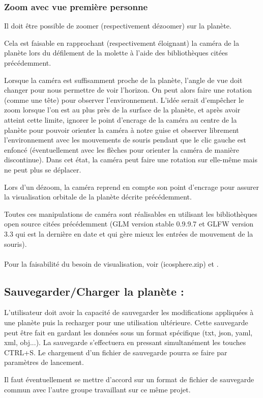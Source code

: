 \documentclass[a4paper]{article}
\begin{document}
        \subsubsection{Zoom avec vue première personne} 
        Il doit être possible de zoomer (respectivement dézoomer) sur la planète. 
        
        Cela est faisable en rapprochant (respectivement éloignant) la caméra de la planète lors du défilement de la molette à l'aide des bibliothèques citées précédemment.
        
        Lorsque la caméra est suffisamment proche de la planète, l'angle de vue doit changer pour nous permettre de voir l'horizon. On peut alors faire une rotation (comme une tête) pour observer l'environnement. L'idée serait d'empêcher le zoom lorsque l'on est au plus près de la surface de la planète, et après avoir atteint cette limite, ignorer le point d'encrage de la caméra au centre de la planète pour pouvoir orienter la caméra à notre guise et observer librement l'environnement avec les mouvements de souris pendant que le clic gauche est enfoncé (éventuellement avec les flèches pour orienter la caméra de manière discontinue). Dans cet état, la caméra peut faire une rotation sur elle-même mais ne peut plus se déplacer. 
        
        Lors d'un dézoom, la caméra reprend en compte son point d'encrage pour assurer la visualisation orbitale de la planète décrite précédemment.
        
        Toutes ces manipulations de caméra sont réalisables en utilisant les bibliothèques open source citées précédemment (GLM version stable  0.9.9.7 et GLFW version 3.3 qui est la dernière en date et qui gère mieux les entrées de mouvement de la souris).
        \\\\
        Pour la faisabilité du besoin de visualisation, voir \cite{SongHoAhn} (icosphere.zip) et \cite{TutoCamera}.\\

\subsection{Sauvegarder/Charger la planète :}

    \indent L'utilisateur doit avoir la capacité de sauvegarder les modifications appliquées à une planète puis la recharger pour une utilisation ultérieure. Cette sauvegarde peut être fait en gardant les données sous un format spécifique (txt, json, yaml, xml, obj...). La sauvegarde s'effectuera en pressant simultanément les touches CTRL+S. Le chargement d'un fichier de sauvegarde pourra se faire par paramètres de lancement.
    \par Il faut éventuellement se mettre d'accord sur un format de fichier de sauvegarde commun avec l'autre groupe travaillant sur ce même projet.
\end{document}
